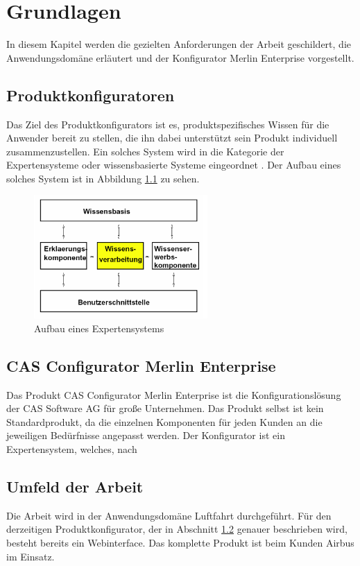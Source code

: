 \chapter{Grundlagen} \label{chapter_2}

In diesem Kapitel werden die gezielten Anforderungen der Arbeit geschildert, die Anwendungsdomäne erläutert und der Konfigurator Merlin Enterprise vorgestellt. 

\section{Produktkonfiguratoren} 
Das Ziel des Produktkonfigurators ist es, produktspezifisches Wissen für die Anwender bereit zu stellen, die ihn dabei unterstützt sein Produkt individuell zusammenzustellen. Ein solches System wird in die Kategorie der Expertensysteme\cite{bib:puppe} oder wissensbasierte Systeme eingeordnet . Der Aufbau eines solches System ist in Abbildung \ref{expert_system_structure} zu sehen. \par
\begin{figure}[hb]
\centering
\includegraphics[width=250px]{images/expertensysteme}
\caption{Aufbau eines Expertensystems \cite[s.6]{bib:keller}}
\label{expert_system_structure}
\end{figure}


\section{CAS Configurator Merlin Enterprise} \label{configurator}
Das Produkt CAS Configurator Merlin Enterprise ist die Konfigurationslösung der CAS Software AG für große Unternehmen. Das Produkt selbst ist kein Standardprodukt, da die einzelnen Komponenten für jeden Kunden an die jeweiligen Bedürfnisse angepasst werden. Der Konfigurator ist ein Expertensystem, welches, nach 


\section{Umfeld der Arbeit}
Die Arbeit wird in der Anwendungsdomäne Luftfahrt durchgeführt. Für den derzeitigen Produktkonfigurator, der in Abschnitt \ref{configurator} genauer beschrieben wird, besteht bereits ein Webinterface. Das komplette Produkt ist beim Kunden Airbus im Einsatz.  


